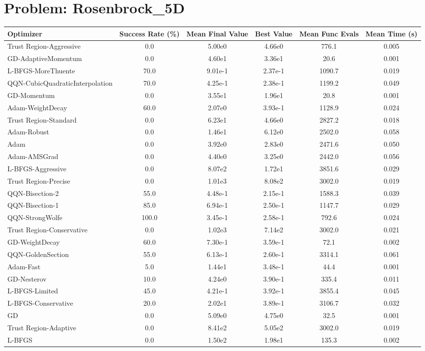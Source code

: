 \documentclass{article}
\begin{document}
\section{Problem: Rosenbrock\_5D}
\begin{longtable}{p{3cm}*{5}{c}}
\toprule
\textbf{Optimizer} & \textbf{Success Rate (\%)} & \textbf{Mean Final Value} & \textbf{Best Value} & \textbf{Mean Func Evals} & \textbf{Mean Time (s)} \\
\midrule
Trust Region-Aggressive & 0.0 & 5.00e0 & 4.66e0 & 776.1 & 0.005 \\
GD-AdaptiveMomentum & 0.0 & 4.60e1 & 3.36e1 & 20.6 & 0.001 \\
L-BFGS-MoreThuente & 70.0 & 9.01e-1 & 2.37e-1 & 1090.7 & 0.019 \\
QQN-CubicQuadraticInterpolation & 70.0 & 4.25e-1 & 2.38e-1 & 1199.2 & 0.049 \\
GD-Momentum & 0.0 & 3.55e1 & 1.96e1 & 20.8 & 0.001 \\
Adam-WeightDecay & 60.0 & 2.07e0 & 3.93e-1 & 1128.9 & 0.024 \\
Trust Region-Standard & 0.0 & 6.23e1 & 4.66e0 & 2827.2 & 0.018 \\
Adam-Robust & 0.0 & 1.46e1 & 6.12e0 & 2502.0 & 0.058 \\
Adam & 0.0 & 3.92e0 & 2.83e0 & 2471.6 & 0.050 \\
Adam-AMSGrad & 0.0 & 4.40e0 & 3.25e0 & 2442.0 & 0.056 \\
L-BFGS-Aggressive & 0.0 & 8.07e2 & 1.72e1 & 3851.6 & 0.029 \\
Trust Region-Precise & 0.0 & 1.01e3 & 8.08e2 & 3002.0 & 0.019 \\
QQN-Bisection-2 & 55.0 & 4.48e-1 & 2.15e-1 & 1588.3 & 0.039 \\
QQN-Bisection-1 & 85.0 & 6.94e-1 & 2.50e-1 & 1147.7 & 0.029 \\
QQN-StrongWolfe & 100.0 & 3.45e-1 & 2.58e-1 & 792.6 & 0.024 \\
Trust Region-Conservative & 0.0 & 1.02e3 & 7.14e2 & 3002.0 & 0.021 \\
GD-WeightDecay & 60.0 & 7.30e-1 & 3.59e-1 & 72.1 & 0.002 \\
QQN-GoldenSection & 55.0 & 6.13e-1 & 2.60e-1 & 3314.1 & 0.061 \\
Adam-Fast & 5.0 & 1.44e1 & 3.48e-1 & 44.4 & 0.001 \\
GD-Nesterov & 10.0 & 4.24e0 & 3.90e-1 & 335.4 & 0.011 \\
L-BFGS-Limited & 45.0 & 4.21e-1 & 3.92e-1 & 3855.4 & 0.045 \\
L-BFGS-Conservative & 20.0 & 2.02e1 & 3.89e-1 & 3106.7 & 0.032 \\
GD & 0.0 & 5.09e0 & 4.75e0 & 32.5 & 0.001 \\
Trust Region-Adaptive & 0.0 & 8.41e2 & 5.05e2 & 3002.0 & 0.019 \\
L-BFGS & 0.0 & 1.50e2 & 1.98e1 & 135.3 & 0.002 \\
\bottomrule
\end{longtable}
\end{document}

